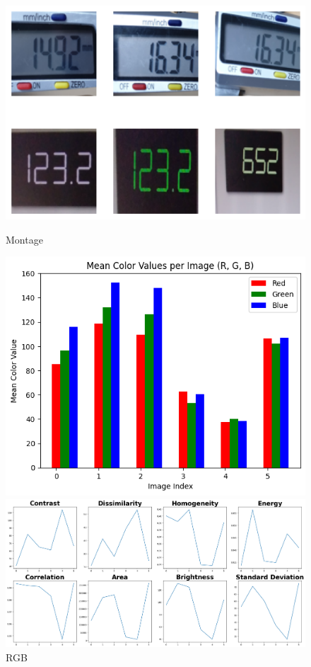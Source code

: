 \begin{figure}[ht]
    \centering
    \begin{minipage}[t]{0.25\textwidth}
        \centering
        \includegraphics[width=\textwidth]{Figures/EDA_Charts/10/montage.png}
        \caption*{Montage}
    \end{minipage}\hfill
    \begin{minipage}[t]{0.25\textwidth}
        \centering
        \includegraphics[width=\textwidth]{Figures/EDA_Charts/10/rgb.png}
        \caption*{RGB}
    \end{minipage}\hfill
    \begin{minipage}[t]{0.50\textwidth}
        \centering
        \includegraphics[width=\textwidth]{Figures/EDA_Charts/10/da.png}

\end{minipage}
\end{figure}
